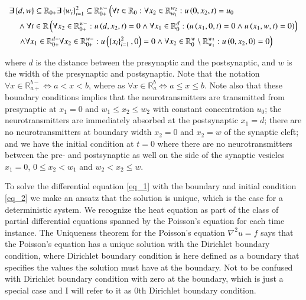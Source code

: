 \documentclass[11pt,english,a4paper]{article}
\begin{document}
\begin{flushleft}
\begin{align}
&\exists \left\lbrace{d, w}\right\rbrace \subseteq \mathbb{R}_{0+}\exists\left\lbrace{w_i}\right\rbrace_{i=1}^2 \subseteq \mathbb{R}_{0+}^{w-}\left(\forall t \in\mathbb{R}_{0}:\forall x_2 \in \mathbb{R}_{w_1}^{w_2} : u\left({0,x_2,t}\right) = u_0  \right.
\nonumber\\
& \quad \wedge \forall  t \in\mathbb{R} \left(\forall x_2\in\mathbb{R}_{0+}^{w-} : u\left({d, x_2, t}\right) = 0 
\wedge \forall x_1\in\mathbb{R}_{0}^d : \left(u\left({x_1,0, t}\right) = 0 \wedge u\left({x_1,w, t}\right) = 0\right) \right)
\nonumber\\
& \quad \left.\wedge
\forall x_1\in\mathbb{R}_{0+}^{d-}\forall x_2\in\mathbb{R}_{0+}^{w-} :u\left({\left\lbrace{x_i}\right\rbrace_{i=1}^2,0}\right)=0 \wedge \forall x_2 \in \mathbb{R}_0^w \setminus \mathbb{R}_{w_1}^{w_2} : u\left({0,x_2,0}\right) = 0 \right)
\label{eq_2}
\end{align}

where $d$ is the distance between the presynaptic and the postsynaptic, and $w$ is the width of the presynaptic and postsynaptic. Note that the notation $\forall x\in\mathbb{R}_{a+}^{b-} \Leftrightarrow a < x < b$, where as $\forall x\in\mathbb{R}_{a}^{b} \Leftrightarrow a \leq x \leq b$. Note also that these boundary conditions implies that the neurotransmitters are transmitted from presynaptic at $x_1=0$ and $w_1 \leq x_2\leq w_2$ with constant concentration $u_0$; the neurotransmitters are  immediately absorbed at the postsynaptic $x_1=d$; there are no neurotransmitters at boundary width $x_2=0$ and $x_2 = w$ of the synaptic cleft; and we have the initial condition at $t=0$ where there are no neurotransmitters between the pre- and postsynaptic as well on the side of the synaptic vesicles $x_1=0$, $0\leq x_2 < w_1$ and $w_2 < x_2 \leq w$. \linebreak


To solve the differential equation \eqref{eq_1} with the boundary and initial condition \eqref{eq_2} we make an ansatz that the solution is unique, which is the case for a deterministic system. We recognize the heat equation as part of the class of partial differential equations spanned by the Poisson's equation for each time instance. The Uniqueness theorem for the Poisson's equation $\nabla^2 u = f$ \cite{Uniqueness} says that the Poisson's equation has a unique solution with the Dirichlet boundary condition, where Dirichlet boundary condition is here defined as a boundary that specifies the values the solution must have at the boundary. Not to be confused with Dirichlet boundary condition with zero at the boundary, which is just a special case and I will refer to it as 0th Dirichlet boundary condition. \linebreak


\end{flushleft}
\end{document}
